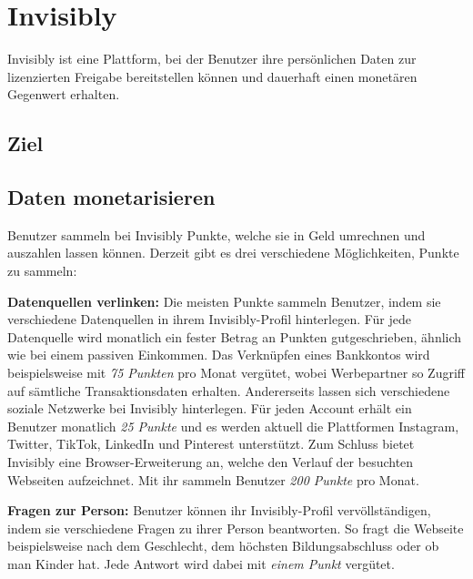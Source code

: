 \section{Invisibly}

Invisibly ist eine Plattform, bei der Benutzer ihre persönlichen Daten zur lizenzierten Freigabe bereitstellen können und dauerhaft einen monetären Gegenwert erhalten.

\subsection{Ziel}
\cite{techRadarInvisibly_2021}

\subsection{Daten monetarisieren}
Benutzer sammeln bei Invisibly Punkte, welche sie in Geld umrechnen und auszahlen lassen können. Derzeit gibt es drei verschiedene Möglichkeiten, Punkte zu sammeln: \newline

\noindent \textbf{Datenquellen verlinken:} Die meisten Punkte sammeln Benutzer, indem sie verschiedene Datenquellen in ihrem Invisibly-Profil hinterlegen. Für jede Datenquelle wird monatlich ein fester Betrag an Punkten gutgeschrieben, ähnlich wie bei einem passiven Einkommen. \cite{pymntsInvisibly_2021} Das Verknüpfen eines Bankkontos wird beispielsweise mit \textit{75 Punkten} pro Monat vergütet, wobei Werbepartner so Zugriff auf sämtliche Transaktionsdaten erhalten. Andererseits lassen sich verschiedene soziale Netzwerke bei Invisibly hinterlegen. Für jeden Account erhält ein Benutzer monatlich \textit{25 Punkte} und es werden aktuell die Plattformen Instagram, Twitter, TikTok, LinkedIn und Pinterest unterstützt. Zum Schluss bietet Invisibly eine Browser-Erweiterung an, welche den Verlauf der besuchten Webseiten aufzeichnet. Mit ihr sammeln Benutzer \textit{200 Punkte} pro Monat. \cite{instagramInvisibly_2021, lifewireInvisibly_2021} \newline

\noindent \textbf{Fragen zur Person:} Benutzer können ihr Invisibly-Profil vervöllständigen, indem sie verschiedene Fragen zu ihrer Person beantworten. So fragt die Webseite beispielsweise nach dem Geschlecht, dem höchsten Bildungsabschluss oder ob man Kinder hat. Jede Antwort wird dabei mit \textit{einem Punkt} vergütet. \cite{instagramInvisibly_2021} \newline

